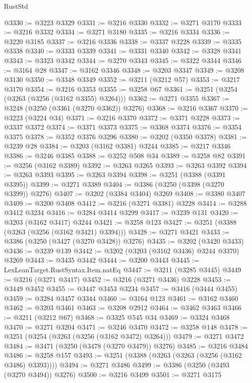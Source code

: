\begin{lexlean}{RustStd}
\begin{coremodule}
@3330 := @3223 @3329
@3331 := @3216 @3330
@3332 := @3271 @3170
@3333 := @3216 @3332
@3334 := @3271 @3180
@3335 := @3216 @3334
@3336 := @3220 @3185
@3337 := @3216 @3336
@3338 := @3337 @3228
@3339 := @3335 @3338
@3340 := @3333 @3339
@3341 := @3331 @3340
@3342 := @3328 @3341
@3343 := @3323 @3342
@3344 := @3270 @3343
@3345 := @3322 @3344
@3346 := @3164 @28
@3347 := @3162 @3346
@3348 := @3203 @3347
@3349 := @3208 @3130
@3350 := @3348 @3349
@3352 := @3211 (@3212 @57)
@3353 := @3217 @3170
@3354 := @3216 @3353
@3355 := @3258 @67
@3361 := @3251 (@3254 (@3263 (@3256 (@3162 @3355) @3264)))
@3362 := @3271 @3355
@3367 := @3248 (@3250 (@3361 (@3270 @3362)) @3276)
@3368 := @3216 @3367
@3370 := @3223 (@3224 @34)
@3371 := @3216 @3370
@3372 := @3371 @3228
@3373 := @3337 @3372
@3374 := @3371 @3373
@3375 := @3368 @3374
@3376 := @3354 @3375
@3378 := @3352 @3376 @3296
@3380 := @3202 (@3350 @3378)
@3381 := @3239 @28
@3384 := @3203 (@3162 @3381) @3244
@3385 := @3217 @3346
@3386 := @3246 @3385
@3388 := @3252 @508 @34
@3389 := @3258 @82
@3391 := @3256 (@3162 @3389)
@3392 := @3263 @3265
@3393 := @3263 @3392
@3394 := @3263 @3393
@3395 := @3263 @3394
@3398 := @3251 (@3388 (@3391 @3395))
@3399 := @3271 @3389
@3404 := @3386 (@3250 (@3398 (@3270 @3399)) @3276)
@3407 := @3202 (@3384 @3404) @3269
@3408 := @3380 @3407
@3409 := @3200 @3408
@3412 := @3216 (@3271 @3381) @3228
@3414 := @3288 @3412 @3234
@3416 := @3284 @3414 @3299
@3417 := @3239 @131
@3420 := @3203 (@3162 @3417) @3244
@3421 := @3258 @123
@3427 := @3251 (@3388 (@3263 (@3256 (@3162 @3421) @3394)))
@3428 := @3271 @3421
@3433 := @3386 (@3250 (@3427 (@3270 @3428)) @3276)
@3435 := @3202 (@3420 @3433)
@3436 := @3239 @139
@3442 := @3202 (@3203 (@3162 @3436) @3244 @3370) @3269
@3443 := @3435 @3442
@3444 := @3200 @3443
@3445 := LexLeanTarget.RustSyntax.Item.natEq
@3447 := @3211 (@3285 @3445)
@3449 := @3216 (@3271 @3417)
@3452 := @3216 (@3271 @3436) @3228
@3453 := @3449 @3452
@3455 := @3447 @3453 @3234
@3457 := @3416 (@3444 @3455)
@3459 := @3284 @3457 @3344
@3460 := @3164 @123
@3461 := @3162 @3460
@3462 := @3203 @3461
@3463 := @3208 @2912
@3464 := @3462 @3463
@3466 := @3211 (@3212 @67)
@3468 := @3325 @545 @34
@3469 := @3324 @3468
@3470 := @3271 @3204
@3471 := @3246 @3470
@3472 := @3258 @148
@3478 := @3251 (@3254 (@3263 (@3256 (@3162 @3472) @3264)))
@3479 := @3271 @3472
@3484 := @3471 (@3250 (@3478 (@3270 @3479)) @3276)
@3485 := @3216 @3484
@3486 := @3258 @157
@3493 := @3251 (@3388 (@3263 (@3263 (@3256 (@3162 @3486) @3393))))
@3494 := @3271 @3486
@3499 := @3386 (@3250 (@3493 (@3270 @3494)) @3276)
@3500 := @3216 @3499
@3501 := @3271 @3175

\end{coremodule}
\end{lexlean}
